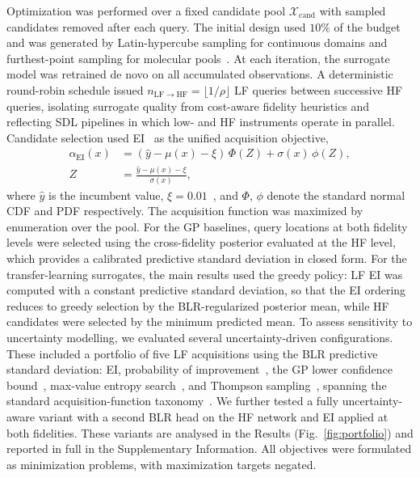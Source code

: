 \documentclass[11pt,a4paper]{article}%
\begin{document}
Optimization was performed over a fixed candidate pool $\mathcal{X}_{\mathrm{cand}}$  with sampled candidates removed after each query. The initial design used $10\%$ of the
budget and was generated by Latin-hypercube sampling for continuous domains and furthest-point
sampling for molecular pools~\citep{mckay2000comparison}. At each iteration, the surrogate model was retrained
de novo on all accumulated observations. A deterministic round-robin
schedule issued $n_{\mathrm{LF}\rightarrow\mathrm{HF}} = \lfloor 1/\rho \rfloor$
LF queries between successive HF queries, isolating surrogate quality
from cost-aware fidelity heuristics and reflecting SDL pipelines in which low- and
HF instruments operate in parallel. Candidate selection used EI~\citep{jones1998efficient} as the unified acquisition objective,
\begin{equation}\label{eq:ei}
\begin{aligned}
\alpha_{\mathrm{EI}}(x) &= (\hat{y} - \mu(x) - \xi)\,\Phi(Z) + \sigma(x)\,\phi(Z), \\
Z &= \frac{\hat{y} - \mu(x) - \xi}{\sigma(x)},
\end{aligned}
\end{equation}
where $\hat{y}$ is the incumbent value, $\xi = 0.01$~\citep{snoek2012practical}, and $\Phi$, $\phi$ denote the
standard normal CDF and PDF respectively. The acquisition function was maximized by enumeration over the pool. For the
GP baselines, query locations at both fidelity levels were selected using the cross-fidelity posterior evaluated at the
HF level, which provides a calibrated predictive standard deviation in closed
form. For the transfer-learning surrogates, the main results used the greedy policy: LF EI was computed with a constant predictive
standard deviation, so that the EI ordering reduces to greedy
selection by the BLR-regularized posterior mean, while HF candidates were selected
by the minimum predicted mean. To assess sensitivity to uncertainty modelling, we evaluated several uncertainty-driven configurations.  These included a portfolio of five LF acquisitions using the BLR predictive standard
deviation: EI, probability of
improvement~\citep{kushner1964new}, the GP lower confidence
bound~\citep{srinivas2012information}, max-value entropy search~\citep{wang2017max}, and
Thompson sampling~\citep{russo2018tutorial}, spanning the standard acquisition-function
taxonomy~\citep{shahriari2015taking}. We further tested a fully uncertainty-aware variant with a
second BLR head on the HF network and EI applied at both fidelities. These variants are analysed in
the Results (Fig.~\ref{fig:portfolio}) and reported in full in the Supplementary
Information. All objectives were formulated as minimization problems, with maximization
targets negated.
\end{document}
